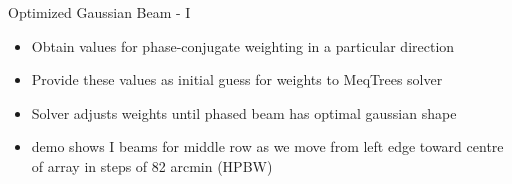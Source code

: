 \documentclass[pdf,azure,slideColor,colorBG]{prosper}
\begin{document}

\begin{slide}{Optimized Gaussian Beam - I}
\begin{small}
\begin{itemize}
\item Obtain values for phase-conjugate weighting in a particular direction
\item Provide these values as initial guess for weights to MeqTrees solver
\item Solver adjusts weights until phased beam has optimal gaussian shape
\item demo shows I beams for middle row as we move from left edge toward centre of array in steps of 82 arcmin (HPBW)
\end{itemize}
\end {small}
{\centering
{}
}
\end{slide}
\end{document}
